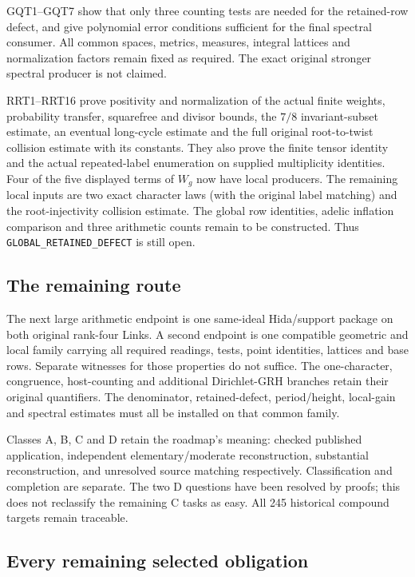 GQT1--GQT7 show that only three counting tests are needed for the
retained-row defect, and give polynomial error conditions sufficient
for the final spectral consumer. All common spaces, metrics, measures,
integral lattices and normalization factors remain fixed as required.
The exact original stronger spectral producer is not claimed.

RRT1--RRT16 prove positivity and normalization of the actual finite
weights, probability transfer, squarefree and divisor bounds, the
$7/8$ invariant-subset estimate, an eventual long-cycle estimate and
the full original root-to-twist collision estimate with its constants.
They also prove the finite tensor identity and the actual repeated-label
enumeration on supplied multiplicity identities. Four of the five
displayed terms of $W_g$ now have local producers. The remaining local
inputs are two exact character laws (with the original label matching)
and the root-injectivity collision estimate. The global row identities,
adelic inflation comparison and three arithmetic counts remain to be
constructed. Thus \texttt{GLOBAL\_\allowbreak RETAINED\_\allowbreak DEFECT} is still open.

\subsection{The remaining route}

The next large arithmetic endpoint is one same-ideal Hida/support
package on both original rank-four Links. A second endpoint is one
compatible geometric and local family carrying all required readings,
tests, point identities, lattices and base rows. Separate witnesses
for those properties do not suffice. The one-character, congruence,
host-counting and additional Dirichlet-GRH branches retain their original
quantifiers. The denominator, retained-defect, period/height, local-gain
and spectral estimates must all be installed on that common family.

Classes A, B, C and D retain the roadmap's meaning: checked published
application, independent elementary/moderate reconstruction, substantial
reconstruction, and unresolved source matching respectively.
Classification and completion are separate. The two D questions have
been resolved by proofs; this does not reclassify the remaining C tasks
as easy. All 245 historical compound targets remain traceable.

\subsection{Every remaining selected obligation}

